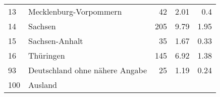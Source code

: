 \begin{longtable}{lXrrr}
     13 &
     \multicolumn{1}{X}{ Mecklenburg-Vorpommern   } &


       \num{42} &
       \num[round-mode=places,round-precision=2]{2,01} &
         \num[round-mode=places,round-precision=2]{0,4} \\

     14 &
     \multicolumn{1}{X}{ Sachsen   } &


       \num{205} &
       \num[round-mode=places,round-precision=2]{9,79} &
         \num[round-mode=places,round-precision=2]{1,95} \\

     15 &
     \multicolumn{1}{X}{ Sachsen-Anhalt   } &


       \num{35} &
       \num[round-mode=places,round-precision=2]{1,67} &
         \num[round-mode=places,round-precision=2]{0,33} \\

     16 &
     \multicolumn{1}{X}{ Thüringen   } &


       \num{145} &
       \num[round-mode=places,round-precision=2]{6,92} &
         \num[round-mode=places,round-precision=2]{1,38} \\

     93 &
     \multicolumn{1}{X}{ Deutschland ohne nähere Angabe   } &


       \num{25} &
       \num[round-mode=places,round-precision=2]{1,19} &
         \num[round-mode=places,round-precision=2]{0,24} \\

     100 &
     \multicolumn{1}{X}{ Ausland   } &



\end{longtable}
